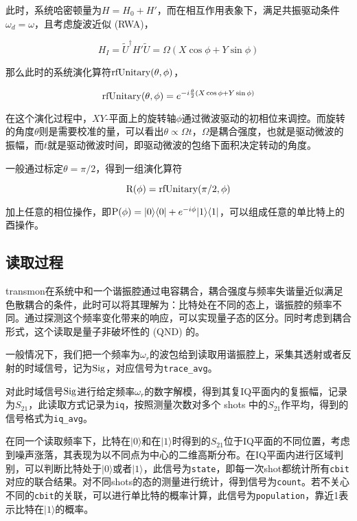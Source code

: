 \documentclass[11pt]{article}
\begin{document}
此时，系统哈密顿量为\(H=H_0+H'\)，而在相互作用表象下，满足共振驱动条件\(\omega_d=\omega\)，且考虑旋波近似
(RWA)，

\[
H_I=\tilde U^\dagger H'\tilde U=\Omega\left(X\cos\phi+Y\sin\phi\right)
\]

那么此时的系统演化算符\({\rm rfUnitary}(\theta, \phi)\)，

\[
{\rm rfUnitary}(\theta, \phi)=e^{-i\frac\theta2\left(X\cos\phi+Y\sin\phi\right)}
\]

在这个演化过程中，\(XY\)-平面上的旋转轴\(\phi\)通过微波驱动的初相位来调控。而旋转的角度\(\theta\)则是需要校准的量，可以看出\(\theta\propto \Omega t\)，\(\Omega\)是耦合强度，也就是驱动微波的振幅，而\(t\)就是驱动微波时间，即驱动微波的包络下面积决定转动的角度。

一般通过标定\(\theta=\pi/2\)，得到一组演化算符

\[
{\rm R}(\phi)={\rm rfUnitary}(\pi/2, \phi)
\]

加上任意的相位操作，即\({\rm P}(\phi)=|0\rangle\langle0|+e^{-i\phi}|1\rangle\langle1|\)，可以组成任意的单比特上的酉操作。

    \subsection{读取过程}\label{ux8bfbux53d6ux8fc7ux7a0b}

    transmon在系统中和一个谐振腔通过电容耦合，耦合强度与频率失谐量近似满足色散耦合的条件，此时可以将其理解为：比特处在不同的态上，谐振腔的频率不同。通过探测这个频率变化带来的响应，可以实现量子态的区分。同时考虑到耦合形式，这个读取是量子非破坏性的
(QND) 的。

一般情况下，我们把一个频率为\(\omega_r\)的波包给到读取用谐振腔上，采集其透射或者反射的时域信号，记为\(\rm Sig\)，对应信号为\texttt{\textquotesingle{}trace\_avg\textquotesingle{}}。

对此时域信号\(\rm Sig\)进行给定频率\(\omega_r\)的数字解模，得到其复IQ平面内的复振幅，记录为\(S_{21}\)，此读取方式记录为\texttt{iq}，按照测量次数对多个
shots
中的\(S_{21}\)作平均，得到的信号格式为\texttt{\textquotesingle{}iq\_avg\textquotesingle{}}。

在同一个读取频率下，比特在\(|0\rangle\)和在\(|1\rangle\)时得到的\(S_{21}\)位于IQ平面的不同位置，考虑到噪声涨落，其表现为以不同点为中心的二维高斯分布。在IQ平面内进行区域判别，可以判断比特处于\(|0\rangle\)或者\(|1\rangle\)，此信号为\texttt{\textquotesingle{}state\textquotesingle{}}，即每一次shot都统计所有\texttt{cbit}对应的联合结果。对不同shots的态的测量进行统计，得到信号为\texttt{\textquotesingle{}count\textquotesingle{}}。若不关心不同的\texttt{\textquotesingle{}cbit\textquotesingle{}}的关联，可以进行单比特的概率计算，此信号为\texttt{\textquotesingle{}population\textquotesingle{}}，靠近1表示比特在\(|1\rangle\)的概率。
\end{document}
